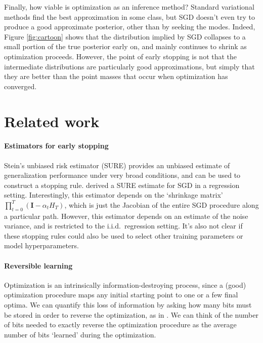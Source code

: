 \documentclass[]{article}
\newcommand{\vI}{\mathbf{I}}
\def\iid{i.i.d.\ }
\newcommand{\stepsize}{\alpha}
\begin{document}
Finally, how viable is optimization as an inference method?
Standard variational methods find the best approximation in some class, but SGD doesn't even try to produce a good approximate posterior, other than by seeking the modes.
Indeed, Figure \ref{fig:cartoon} shows that the distribution implied by SGD collapses to a small portion of the true posterior early on, and mainly continues to shrink as optimization proceeds.
However, the point of early stopping is not that the intermediate distributions are particularly good approximations, but simply that they are better than the point masses that occur when optimization has converged.


\section{Related work}

\paragraph{Estimators for early stopping}
Stein's unbiased risk estimator (SURE) \citep{stein1981estimation} provides an unbiased estimate of generalization performance under very broad conditions, and can be used to construct a stopping rule.
\citet{raskutti2014early} derived a SURE estimate for SGD in a regression setting.
Interestingly, this estimator depends on the `shrinkage matrix' $\prod_{t=0}^{T} \left( \vI - \stepsize_t H_T \right)$, which is just the Jacobian of the entire SGD procedure along a particular path.
However, this estimator depends on an estimate of the noise variance, and is restricted to the \iid regression setting.
It's also not clear if these stopping rules could also be used to select other training parameters or model hyperparameters.


\paragraph{Reversible learning} 
Optimization is an intrinsically information-destroying process, since a (good) optimization procedure maps any initial starting point to one or a few final optima.
We can quantify this loss of information by asking how many bits must be stored in order to reverse the optimization, as in \citet{MacDuvAda2015hyper}.
We can think of the number of bits needed to exactly reverse the optimization procedure as the average number of bits `learned' during the optimization.
\end{document}

